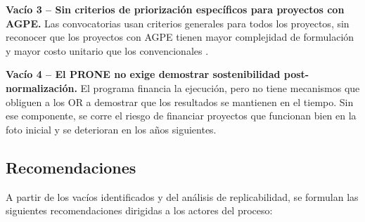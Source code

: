 \textbf{Vacío 3 -- Sin criterios de priorización específicos para
proyectos con AGPE.} Las convocatorias usan criterios generales para
todos los proyectos, sin reconocer que los proyectos con AGPE tienen
mayor complejidad de formulación y mayor costo unitario que los
convencionales \parencite{ResolucionMME40243_2025}.

\textbf{Vacío 4 -- El PRONE no exige demostrar sostenibilidad
post-normalización.} El programa financia la ejecución, pero no tiene
mecanismos que obliguen a los OR a demostrar que los resultados se
mantienen en el tiempo. Sin ese componente, se corre el riesgo de
financiar proyectos que funcionan bien en la foto inicial y se
deterioran en los años siguientes.

\subsection{Recomendaciones}
\label{subsec:recomendaciones}

A partir de los vacíos identificados y del análisis de replicabilidad,
se formulan las siguientes recomendaciones dirigidas a los actores del
proceso:

